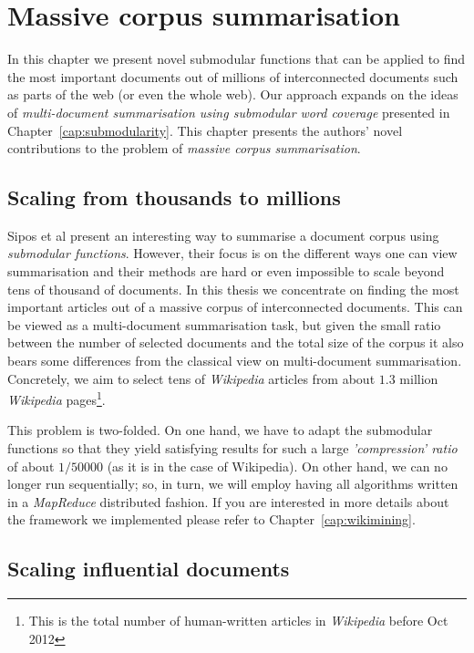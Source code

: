 \chapter{Massive corpus summarisation}

In this chapter we present novel submodular functions that can be applied to
find the most important documents out of millions of interconnected documents
such as parts of the web (or even the whole web).
Our approach expands on the ideas of \emph{multi-document summarisation using
submodular word coverage} \cite{sipos2012temporal} presented in
Chapter~\vref{cap:submodularity}.
This chapter presents the authors' novel contributions to the problem of
\emph{massive corpus summarisation}.

\section{Scaling from thousands to millions}

Sipos et al \cite{sipos2012temporal} present an interesting way to summarise a
document corpus using \emph{submodular functions}. However, their focus is on
the different ways one can view summarisation and their methods are hard or
even impossible to scale beyond tens of thousand of documents.
In this thesis we concentrate on finding the most important articles out of a
massive corpus of interconnected documents. This can be viewed as a
multi-document summarisation task, but given the small ratio between the
number of selected documents and the total size of the corpus it also bears
some differences from the classical view on multi-document summarisation.
Concretely, we aim to select tens of \emph{Wikipedia} articles from about
\(1.3\) million \emph{Wikipedia} pages\footnote{This is the total number of
human-written articles in \emph{Wikipedia} before Oct 2012}.

This problem is two-folded. On one hand, we have to adapt the submodular
functions so that they yield satisfying results for such a large
\emph{'compression' ratio} of about \(1/50000\) (as it is in the case of
Wikipedia). On other hand, we can no longer run sequentially; so, in turn, we
will employ having all algorithms written in a \emph{MapReduce}
\cite{dean2008mapreduce} distributed fashion. If you are interested in more
details about the framework we implemented please refer to
Chapter~\vref{cap:wikimining}.

\section{Scaling influential documents}
\label{sec:scale-doc-influence}

